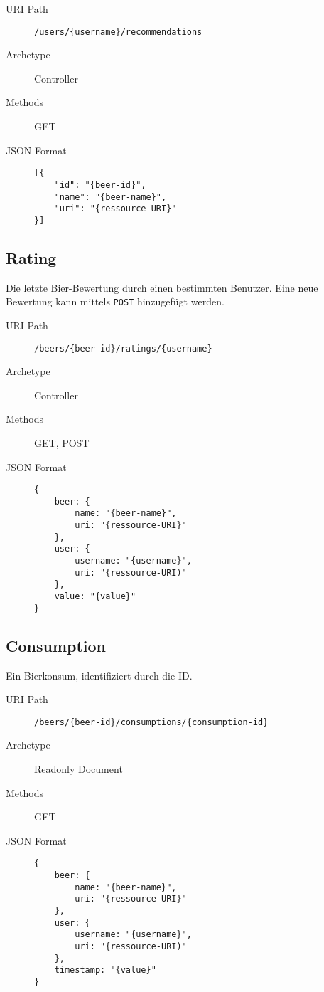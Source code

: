 \documentclass[10pt,a4paper]{scrartcl}
\begin{document}
\begin{description}
	\item[URI Path] \texttt{/users/\{username\}/recommendations}
	\item[Archetype] Controller
	\item[Methods] GET
	\item[JSON Format] \hfill
\begin{lstlisting}
[{
	"id": "{beer-id}",
	"name": "{beer-name}",
	"uri": "{ressource-URI}"
}]
\end{lstlisting}
\end{description}


\subsection{Rating}

Die letzte Bier-Bewertung durch einen bestimmten Benutzer. Eine neue Bewertung kann mittels \texttt{POST} hinzugefügt werden.

\begin{description}
	\item[URI Path] \texttt{/beers/\{beer-id\}/ratings/\{username\}}
	\item[Archetype] Controller
	\item[Methods] GET, POST
	\item[JSON Format] \hfill
\begin{lstlisting}
{
	beer: {
		name: "{beer-name}",
		uri: "{ressource-URI}"
	},
	user: {
		username: "{username}",
		uri: "{ressource-URI)"
	},
	value: "{value}"
}
	\end{lstlisting}
\end{description}

\subsection{Consumption}

Ein Bierkonsum, identifiziert durch die ID.

\begin{description}
	\item[URI Path] \texttt{/beers/\{beer-id\}/consumptions/\{consumption-id\}}
	\item[Archetype] Readonly Document
	\item[Methods] GET
	\item[JSON Format] \hfill
\begin{lstlisting}
{
	beer: {
		name: "{beer-name}",
		uri: "{ressource-URI}"
	},
	user: {
		username: "{username}",
		uri: "{ressource-URI)"
	},
	timestamp: "{value}"
}
\end{lstlisting}
\end{description}
\end{document}
